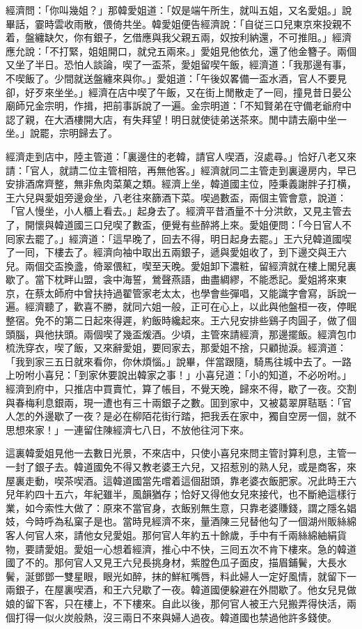 經濟問：「你叫幾姐？」那韓愛姐道：「奴是端午所生，就叫五姐，又名愛姐。」說畢話，霎時雲收雨散，偎倚共坐。韓愛姐便告經濟說：「自従三口兒東京來投親不着，盤纏缺欠，你有銀子，乞借應與我父親五兩，奴按利納還，不可推阻。」經濟應允說：「不打緊，姐姐開口，就兌五兩來。」愛姐見他依允，還了他金簪子。兩個又坐了半日。恐怕人談論，喫了一盃茶，愛姐留喫午飯，經濟道：「我那邊有事，不喫飯了。少間就送盤纏來與你。」愛姐道：「午後奴畧備一盃水酒，官人不要見卻，好歹來坐坐。」經濟在店中喫了午飯，又在街上閒散走了一囘，撞見昔日晏公廟師兄金宗明，作揖，把前事訴說了一遍。金宗明道：「不知賢弟在守備老爺府中認了親，在大酒樓開大店，有失拜望！明日就使徒弟送茶來。閒中請去廟中坐一坐。」說罷，宗明歸去了。

經濟走到店中，陸主管道：「裏邊住的老韓，請官人喫酒，沒處尋。」恰好八老又來請：「官人，就請二位主管相陪，再無他客。」經濟就同二主管走到裏邊房内，早已安排酒席齊整，無非魚肉菜菓之類。經濟上坐，韓道國主位，陸秉義謝胖子打横，王六兒與愛姐旁邊僉坐，八老往來篩酒下菜。喫過數盃，兩個主管會意，說道：「官人慢坐，小人櫃上看去。」起身去了。經濟平昔酒量不十分洪飲，又見主管去了，開懷與韓道國三口兒喫了數盃，便覺有些醉將上來。愛姐便問：「今日官人不囘家去罷了。」經濟道：「這早晚了，回去不得，明日起身去罷。」王六兒韓道國喫了一囘，下樓去了。經濟向袖中取出五兩銀子，遞與愛姐收了，到下邊交與王六兒。兩個交盃換盞，倚翠偎紅，喫至天晚。愛姐卸下濃粧，留經濟就在樓上閣兒裏歇了。當下枕畔山盟，衾中海誓，鶯聲燕語，曲盡綢繆，不能悉記。愛姐將來東京，在蔡太師府中曾扶持過翟管家老太太，也學會些彈唱，又能識字會寫，訴說一遍。經濟聽了，歡喜不勝，就同六姐一般，正可在心上，以此與他盤桓一夜，停眠整宿。免不的第二日起來得遲，約飯時纔起來。王六兒安排些鷄子肉圓子，做了個頭腦，與他扶頭。兩個喫了幾盃煖酒。少頃，主管來請經濟，那邊擺飯。經濟包巾梳洗穿衣，喫了飯，又來辭愛姐，要囘家去，那愛姐不捨，只顧抛淚。經濟道：「我到家三五日就來看你，你休煩惱。」說畢，伴當跟隨，騎馬往城中去了。一路上吩咐小喜兒：「到家休要說出韓家之事！」小喜兒道：「小的知道，不必吩咐。」經濟到府中，只推店中買賣忙，算了帳目，不覺天晚，歸來不得，歇了一夜。交割與春梅利息銀兩，現一遭也有三十兩銀子之數。囬到家中，又被葛翠屏聐聒：「官人怎的外邊歇了一夜？是必在柳陌花街行踏，把我丢在家中，獨自空房一個，就不思想來家！」一連留住陳經濟七八日，不放他往河下來。

這裏韓愛姐見他一去數日光景，不來店中，只使小喜兒來問主管討算利息，主管一一封了銀子去。韓道國免不得又教老婆王六兒，又招惹別的熟人兒，或是商客，來屋裏走動，喫茶喫酒。這韓道國當先嚐着這個甜頭，靠老婆衣飯肥家。况此時王六兒年約四十五六，年紀雖半，風韻猶存；恰好又得他女兒來接代，也不斷絶這樣行業，如今索性大做了：原來不當官身，衣飯别無生意，只靠老婆賺錢，謂之隱名娼妓，今時呼為私窠子是也。當時見經濟不來，量酒陳三兒替他勾了一個湖州販絲綿客人何官人來，請他女兒愛姐。那何官人年約五十餘歲，手中有千兩絲綿紬絹貨物，要請愛姐。愛姐一心想着經濟，推心中不快，三囘五次不肯下樓來。急的韓道國了不的。那何官人又見王六兒長挑身材，紫膛色瓜子面皮，描眉鋪鬢，大長水鬢，涎鄧鄧一雙星眼，眼光如醉，抹的鮮紅嘴唇，料此婦人一定好風情，就留下一兩銀子，在屋裏喫酒，和王六兒歇了一夜。韓道國便躱避在外間歇了。他女兒見做娘的留下客，只在樓上，不下樓來。自此以後，那何官人被王六兒搬弄得快活，兩個打得一似火炭般熱，沒三兩日不來與婦人過夜。韓道國也禁過他許多錢使。

